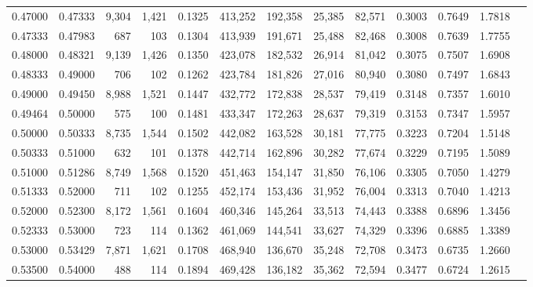 \begin{tabular}{rrrrrrrrrrrrr}
0.47000 & 0.47333 &  9,304 & 1,421 &                                     0.1325 & 413,252 & 192,358 &  25,385 &  82,571 & 0.3003 & 0.7649 & 1.7818 \\
0.47333 & 0.47983 &    687 &   103 &                                     0.1304 & 413,939 & 191,671 &  25,488 &  82,468 & 0.3008 & 0.7639 & 1.7755 \\
0.48000 & 0.48321 &  9,139 & 1,426 &                                     0.1350 & 423,078 & 182,532 &  26,914 &  81,042 & 0.3075 & 0.7507 & 1.6908 \\
0.48333 & 0.49000 &    706 &   102 &                                     0.1262 & 423,784 & 181,826 &  27,016 &  80,940 & 0.3080 & 0.7497 & 1.6843 \\
0.49000 & 0.49450 &  8,988 & 1,521 &                                     0.1447 & 432,772 & 172,838 &  28,537 &  79,419 & 0.3148 & 0.7357 & 1.6010 \\
0.49464 & 0.50000 &    575 &   100 &                                     0.1481 & 433,347 & 172,263 &  28,637 &  79,319 & 0.3153 & 0.7347 & 1.5957 \\
0.50000 & 0.50333 &  8,735 & 1,544 &                                     0.1502 & 442,082 & 163,528 &  30,181 &  77,775 & 0.3223 & 0.7204 & 1.5148 \\
0.50333 & 0.51000 &    632 &   101 &                                     0.1378 & 442,714 & 162,896 &  30,282 &  77,674 & 0.3229 & 0.7195 & 1.5089 \\
0.51000 & 0.51286 &  8,749 & 1,568 &                                     0.1520 & 451,463 & 154,147 &  31,850 &  76,106 & 0.3305 & 0.7050 & 1.4279 \\
0.51333 & 0.52000 &    711 &   102 &                                     0.1255 & 452,174 & 153,436 &  31,952 &  76,004 & 0.3313 & 0.7040 & 1.4213 \\
0.52000 & 0.52300 &  8,172 & 1,561 &                                     0.1604 & 460,346 & 145,264 &  33,513 &  74,443 & 0.3388 & 0.6896 & 1.3456 \\
0.52333 & 0.53000 &    723 &   114 &                                     0.1362 & 461,069 & 144,541 &  33,627 &  74,329 & 0.3396 & 0.6885 & 1.3389 \\
0.53000 & 0.53429 &  7,871 & 1,621 &                                     0.1708 & 468,940 & 136,670 &  35,248 &  72,708 & 0.3473 & 0.6735 & 1.2660 \\
0.53500 & 0.54000 &    488 &   114 &                                     0.1894 & 469,428 & 136,182 &  35,362 &  72,594 & 0.3477 & 0.6724 & 1.2615 \\

\end{tabular}
